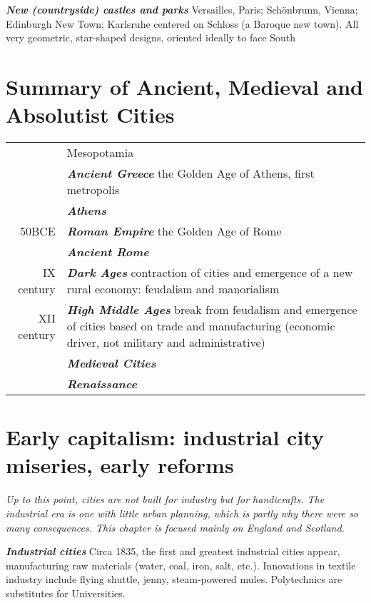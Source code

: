 \documentclass{article}
\newcommand{\foo}{\hspace{-2.3pt}$\bullet$ \hspace{5pt} }
\newcommand{\bisection}[1]{\textbf{\textit{#1}}}
\begin{document}
\bisection{New (countryside) castles and parks} Versailles, Paris; Schönbrunn, Vienna; Edinburgh New Town; Karlsruhe centered on Schloss (a Baroque new town). All very geometric, star-shaped designs, oriented ideally to face South

\pagebreak
\section{Summary of Ancient, Medieval and Absolutist Cities}

\begin{tabular}{r |@{\foo} p{}}
 & Mesopotamia\\
 & \bisection{Ancient Greece} the Golden Age of Athens, first metropolis \\
 & \bisection{Athens} \\
50BCE & \bisection{Roman Empire} the Golden Age of Rome \\
 & \bisection{Ancient Rome} \\
IX century & \bisection{Dark Ages} contraction of cities and emergence of a new rural economy: feudalism and manorialism\\
XII century & \bisection{High Middle Ages} break from feudalism and emergence of cities based on trade and manufacturing (economic driver, not military and administrative) \\
 & \bisection{Medieval Cities} \\
 & \bisection{Renaissance} \\
\end{tabular}


\pagebreak
\section{Early capitalism: industrial city miseries, early reforms}

\textit{Up to this point, cities are not built for industry but for handicrafts. The industrial era is one with little urban planning, which is partly why there were so many consequences. This chapter is focused mainly on England and Scotland.}

\bisection{Industrial cities} Circa 1835, the first and greatest industrial cities appear, manufacturing raw materials (water, coal, iron, salt, etc.). Innovations in textile industry include flying shuttle, jenny, steam-powered mules. Polytechnics are substitutes for Universities.
\end{document}
